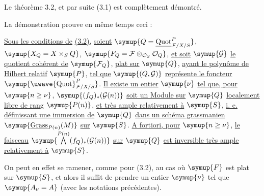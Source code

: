 Le théorème 3.2, et par suite (3.1) est complètement démontré.

La démonstration prouve en même temps ceci :

 \uline{Sous les conditions de} \uline{(3.2)}, \uline{soient}
$\symup{Q=\underline{\operatorname{Quot}}^P_{\mathcal F/X/S}}$, $\symup{X_Q=X\times_SQ}$,
$\symup{F_Q=\mathcal F\otimes_{\mathcal O_S}\mathcal O_Q}$, \uline{et soit}
$\symup{\mathcal G}$ \uline{le quotient cohérent de} $\symup{\mathcal F_Q}$, \uline{plat sur} $\symup{Q}$, \uline{ayant le
polynôme de Hilbert relatif} $\symup{P}$, \uline{tel que} $\symup{(Q,\mathcal G)}$ \uline{représente le foncteur}
$\symup{\mathop{\text{\uwave{Quot}}}\nolimits^P_{\mathcal F/X/S}}$. \uline{Il existe un entier}
$\symup{\nu}$ \uline{tel que, pour} $\symup{n\geq\nu}$, $\symup{(f_Q)_*(\mathcal G(n))}$ \uline{soit un Module sur} $\symup{Q}$
\uline{localement libre de rang} $\symup{P(n)}$, \uline{et très ample relativement à} $\symup{S}$, \uline{i. e.
définissant une immersion de} $\symup{Q}$ \uline{dans un schéma grassmanien}
$\symup{\underline{\operatorname{Grass}}_{P(n)}(M)}$ \uline{sur} $\symup{S}$. \uline{A fortiori, pour} $\symup{n\geq\nu}$, \uline{le
faisceau} $\symup{\mathop{\bigwedge}\limits^{P(n)}(f_Q)_*(\mathcal G(n))}$ \uline{sur} $\symup{Q}$ \uline{est inversible très ample relativement à} $\symup{S}$.

On peut en effet se ramener, comme pour (3.2), au cas où $\symup{F}$ est plat
sur $\symup{S}$, et alors il suffit de prendre un entier $\symup{\nu}$ tel que $\symup{A_\nu=A}$ (avec
les notations précédentes).

